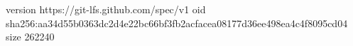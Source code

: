 version https://git-lfs.github.com/spec/v1
oid sha256:aa34d55b0363dc2d4e22bc66bf3fb2acfacea08177d36ee498ea4c4f8095cd04
size 262240

